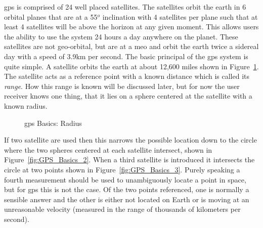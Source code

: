 \ac{gps} is comprised of 24 well placed satellites. The satellites orbit the earth in 6 orbital planes that are at a 55$^o$ inclination with 4 satellites per plane such that at least 4 satellites will be above the horizon at any given moment. This allows users the ability to use the system 24 hours a day anywhere on the planet. These satellites are not geo-orbital, but are at a \ac{meo} and orbit the earth twice a sidereal day with a speed of 3.9km per second.  The basic principal of the \ac{gps} system is quite simple.  A satellite orbits the earth at about 12,600 miles shown in Figure~\ref{fig:GPS_Basics_1}. The satellite acts as a reference point with a known distance which is called its \textit{range}.  How this range is known will be discussed later, but for now the user receiver knows one thing, that it lies on a sphere centered at the satellite with a known radius.

\begin{figure}
  \centering
  \caption{\ac{gps} Basics: Radius}
	\label{fig:GPS_Basics_1}
\end{figure}

If two satellite are used then this narrows the possible location down to the circle where the two spheres centered at each satellite intersect, shown in Figure~\ref{fig:GPS_Basics_2}. When a third satellite is introduced it intersects the circle at two points shown in Figure~\ref{fig:GPS_Basics_3}. Purely speaking a fourth measurement should be used to unambiguously locate a point in space, but for \ac{gps} this is not the case.  Of the two points referenced, one is normally a sensible answer and the other is either not located on Earth or is moving at an unreasonable velocity (measured in the range of thousands of kilometers per second).


